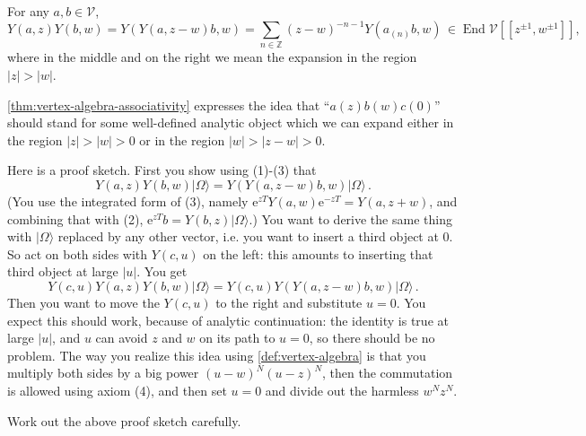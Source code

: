 \documentclass[12pt,letterpaper,reqno]{amsart}
\numberwithin{equation}{section}
\newcommand{\bbZ}{\ensuremath{\mathbb Z}}
\newcommand{\e}{{\mathrm e}}
\newcommand\vac{{|\Omega\rangle}}
\newcommand{\vertex}{\mathcal{V}}
\newcommand{\abs}[1]{\lvert#1\rvert}
\DeclareMathOperator{\End}{End}
\begin{document}
\begin{thm} \label{thm:vertex-algebra-associativity} For any $a,b \in \vertex$,
\begin{equation}
Y(a,z) Y(b,w) = Y(Y(a,z-w)b,w) = \sum_{n \in \bbZ} (z-w)^{-n-1} Y(a_{(n)} b, w) \, \in \End \vertex[[z^{\pm 1},w^{\pm 1}]] ,  
\end{equation}
where in the middle and
on the right we mean the expansion in the region $\abs{z} > \abs{w}$.
\end{thm}

\autoref{thm:vertex-algebra-associativity} expresses the idea that
``$a(z) b(w) c(0)$'' should stand for some 
well-defined analytic object
which we can expand either in the region $\abs{z} > \abs{w} > 0$
or in the region $\abs{w} > \abs{z-w} > 0$.

Here is a proof sketch. 
First you show using (1)-(3) that
\begin{equation}
  Y(a,z) Y(b,w) \vac = Y(Y(a,z-w) b, w) \vac \, .
\end{equation}
(You use the integrated form of (3), namely 
$\e^{z T} Y(a,w) \e^{-z T} = Y(a,z+w)$, and combining
that with (2), $\e^{z T} b = Y(b,z) \vac$.)
You want to derive the same thing with $\vac$ replaced
by any other vector, i.e. you want to insert a third
object at $0$. So act on both sides with $Y(c, u)$ on the left: this amounts to inserting that third object at large $\abs{u}$.
You get
\begin{equation}
  Y(c,u) Y(a,z) Y(b,w) \vac = Y(c,u) Y(Y(a,z-w) b, w) \vac \, .
\end{equation}
Then you want to move the $Y(c,u)$ to the right
and substitute $u=0$. 
You expect this should work, because of analytic 
continuation: the identity is true at large $\abs{u}$, and $u$ 
can avoid $z$ and $w$ on its path to $u=0$, 
so there should be no problem.
The way you realize this idea using \autoref{def:vertex-algebra}
is that you multiply both sides by
a big power $(u-w)^N (u-z)^N$, then the commutation is 
allowed using axiom (4), and then set $u = 0$ and divide
out the harmless $w^N z^N$.

\begin{exercise}
Work out the above proof sketch carefully.
\end{exercise}



\end{document}
